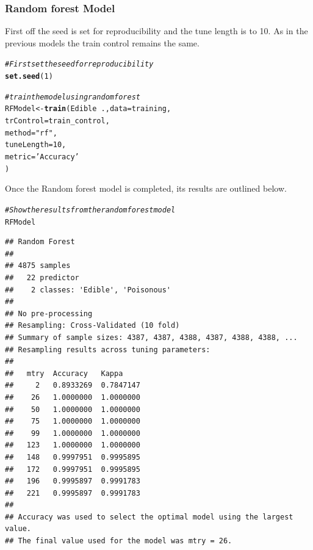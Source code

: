 \documentclass[10pt  ,usenames, dvipsnames]{article}\usepackage[]{graphicx}\usepackage[]{color}
\makeatletter
\newcommand{\hlnum}[1]{\textcolor[rgb]{0.686,0.059,0.569}{#1}}%
\newcommand{\hlstr}[1]{\textcolor[rgb]{0.192,0.494,0.8}{#1}}%
\newcommand{\hlcom}[1]{\textcolor[rgb]{0.678,0.584,0.686}{\textit{#1}}}%
\newcommand{\hlopt}[1]{\textcolor[rgb]{0,0,0}{#1}}%
\newcommand{\hlstd}[1]{\textcolor[rgb]{0.345,0.345,0.345}{#1}}%
\newcommand{\hlkwb}[1]{\textcolor[rgb]{0.69,0.353,0.396}{#1}}%
\newcommand{\hlkwc}[1]{\textcolor[rgb]{0.333,0.667,0.333}{#1}}%
\newcommand{\hlkwd}[1]{\textcolor[rgb]{0.737,0.353,0.396}{\textbf{#1}}}%
\newenvironment{kframe}{%
 \def\at@end@of@kframe{}%
 \ifinner\ifhmode%
  \def\at@end@of@kframe{\end{minipage}}%
  \begin{minipage}{\columnwidth}%
 \fi\fi%
 \def\FrameCommand##1{\hskip\@totalleftmargin \hskip-\fboxsep
 \colorbox{shadecolor}{##1}\hskip-\fboxsep
     \hskip-\linewidth \hskip-\@totalleftmargin \hskip\columnwidth}%
 \MakeFramed {\advance\hsize-\width
   \@totalleftmargin\z@ \linewidth\hsize
   \@setminipage}}%
 {\par\unskip\endMakeFramed%
 \at@end@of@kframe}
\newenvironment{knitrout}{}{} %
\makeatother
\begin{document}
\clearpage

\subsubsection{Random forest Model}

First off the seed is set for reproducibility and the tune length is to 10.
As in the previous models the train control remains the same.

\begin{knitrout}
\color{fgcolor}\begin{kframe}
\begin{alltt}
\hlcom{#First set the seed for reproducibility}
\hlkwd{set.seed}\hlstd{(}\hlnum{1}\hlstd{)}

\hlcom{# train the model using random forest}
\hlstd{RFModel}\hlkwb{<-} \hlkwd{train}\hlstd{(Edible}\hlopt{~}\hlstd{.,} \hlkwc{data}\hlstd{=training,}
                \hlkwc{trControl}\hlstd{=train_control,}
                \hlkwc{method}\hlstd{=}\hlstr{"rf"}\hlstd{,}
                \hlkwc{tuneLength} \hlstd{=}\hlnum{10}\hlstd{,}
                \hlkwc{metric} \hlstd{=} \hlstr{'Accuracy'}
\hlstd{)}
\end{alltt}
\end{kframe}
\end{knitrout}




Once the Random forest model is completed, its results are outlined below.
\begin{knitrout}
\color{fgcolor}\begin{kframe}
\begin{alltt}
\hlcom{#Show the results from the random forest model}
\hlstd{RFModel}
\end{alltt}
\end{kframe}
\end{knitrout}


\begin{knitrout}
\color{fgcolor}\begin{kframe}
\begin{verbatim}
## Random Forest 
## 
## 4875 samples
##   22 predictor
##    2 classes: 'Edible', 'Poisonous' 
## 
## No pre-processing
## Resampling: Cross-Validated (10 fold) 
## Summary of sample sizes: 4387, 4387, 4388, 4387, 4388, 4388, ... 
## Resampling results across tuning parameters:
## 
##   mtry  Accuracy   Kappa    
##     2   0.8933269  0.7847147
##    26   1.0000000  1.0000000
##    50   1.0000000  1.0000000
##    75   1.0000000  1.0000000
##    99   1.0000000  1.0000000
##   123   1.0000000  1.0000000
##   148   0.9997951  0.9995895
##   172   0.9997951  0.9995895
##   196   0.9995897  0.9991783
##   221   0.9995897  0.9991783
## 
## Accuracy was used to select the optimal model using the largest value.
## The final value used for the model was mtry = 26.
\end{verbatim}
\end{kframe}
\end{knitrout}
\end{document}
